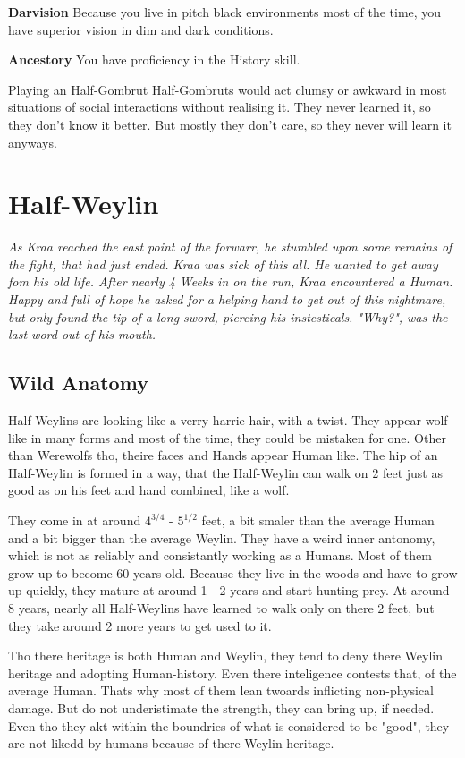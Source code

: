 \documentclass[10pt,twoside,twocolumn,openany]{book}
\begin{document}
\textbf{Darvision} Because you live in pitch black environments most of the time, you have superior vision in dim and dark conditions. 

\textbf{Ancestory} You have proficiency in the History skill.

\begin{commentbox}{Playing an Half-Gombrut}
Half-Gombruts would act clumsy or awkward in most situations of social interactions without realising it. They never learned it, so they don't know it better. But mostly they don't care, so they never will learn it anyways.
\end{commentbox}

\newpage\mbox{}
\newpage
\section{Half-Weylin}

\textit{As Kraa reached the east point of the forwarr, he stumbled upon some remains of the fight, that had just ended. Kraa was sick of this all. He wanted to get away fom his old life. After nearly 4 Weeks in on the run, Kraa encountered a Human. Happy and full of hope he asked for a helping hand to get out of this nightmare, but only found the tip of a long sword, piercing his instesticals. "Why?", was the last word out of his mouth.}

\subsection{Wild Anatomy}
Half-Weylins are looking like a verry harrie hair, with a twist. They appear wolf-like in many forms and most of the time, they could  be mistaken for one. Other than Werewolfs tho, theire faces and Hands appear Human like. The hip of an Half-Weylin is formed in a way, that the Half-Weylin can walk on 2 feet just as good as on his feet and hand combined, like a wolf.

They come in at around $4^{3/4}$ - $5^{1/2}$ feet, a bit smaler than the average Human and a bit bigger than the average Weylin. They have a weird inner antonomy, which is not as reliably and consistantly working as a Humans. Most of them grow up to become 60 years old. Because they live in the woods and have to grow up quickly, they mature at around 1 - 2 years and start hunting prey. At around 8 years, nearly all Half-Weylins have learned to walk only on there 2 feet, but they take around 2 more years to get used to it.

Tho there heritage is both Human and Weylin, they tend to deny there Weylin heritage and adopting Human-history. Even there inteligence contests that, of the average Human. Thats why most of them lean twoards inflicting non-physical damage. But do not underistimate the strength, they can bring up, if needed. Even tho they akt within the boundries of what is considered to be "good", they are not likedd by humans because of there Weylin heritage.
\end{document}
